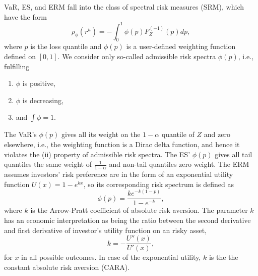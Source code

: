 VaR, ES, and ERM fall into the class of spectral risk measures (SRM),
which have the form \citep{Acerbi2002}%
\begin{equation*}
  \rho_\phi(r^h) = - \int_0^1 \phi(p) F_{Z}^{(-1)}(p)d p,
\end{equation*}
where $p$ is the loss quantile and $\phi(p)$ is a user-defined
weighting function defined on $[0,1]$.
We consider only so-called admissible risk spectra $\phi(p)$, i.e.,
fulfilling %
\begin{enumerate}[label=(\roman*)]
\item $\phi$ is positive,
\item $\phi$ is decreasing,
\item and $\int\phi=1$. 
\end{enumerate}

The VaR's $\phi(p)$ gives all its weight on the $1-\alpha$ quantile of
$Z$ and zero elsewhere, i.e., the weighting function is a Dirac delta
function, and hence it violates the (ii) property of admissible risk
spectra.  
The ES' $\phi(p)$ gives all tail quantiles the same weight of
$\displaystyle\frac{1}{1-\alpha}$ and non-tail quantiles zero weight. 
The ERM assumes investors' risk preference are in the form of an
exponential utility function $U(x)=1-e^{kx}$, so its corresponding
risk spectrum is defined as
\begin{equation*}
  \phi(p) =\frac{k e^{-k(1-p)}}{1-e^{-k}} , \label{eq:phi}
\end{equation*}
where $k$ is the Arrow-Pratt coefficient of absolute risk aversion. 
The parameter $k$ has an economic interpretation as being the ratio
between the second derivative and first derivative 
of investor's utility function on an risky asset,
\begin{equation*}
  k = -\frac{U''(x)}{U'(x)},
\end{equation*}
for $x$ in all possible outcomes.
In case of the exponential utility, $k$ is the the constant absolute risk aversion (CARA).


